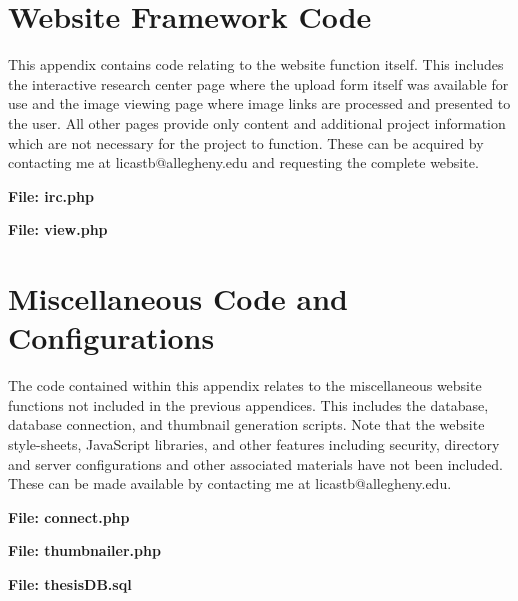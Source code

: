 \chapter{Website Framework Code}\label{appb:wejbcode}
This appendix contains code relating to the website function itself. This includes the interactive research center page where the upload form itself was available for use and the image viewing page where image links are processed and presented to the user. All other pages provide only content and additional project information which are not necessary for the project to function. These can be acquired by contacting me at licastb@allegheny.edu and requesting the complete website.

\textbf{File: irc.php}

\newpage
\textbf{File: view.php}

\newpage

\chapter{Miscellaneous Code and Configurations}\label{appc:misccode}
The code contained within this appendix relates to the miscellaneous website functions not included in the previous appendices. This includes the database, database connection, and thumbnail generation scripts. Note that the website style-sheets, JavaScript libraries, and other features including security, directory and server configurations and other associated materials have not been included. These can be made available by contacting me at licastb@allegheny.edu.

\textbf{File: connect.php}

\newpage
\textbf{File: thumbnailer.php}

\newpage


\textbf{File: thesisDB.sql}

\newpage